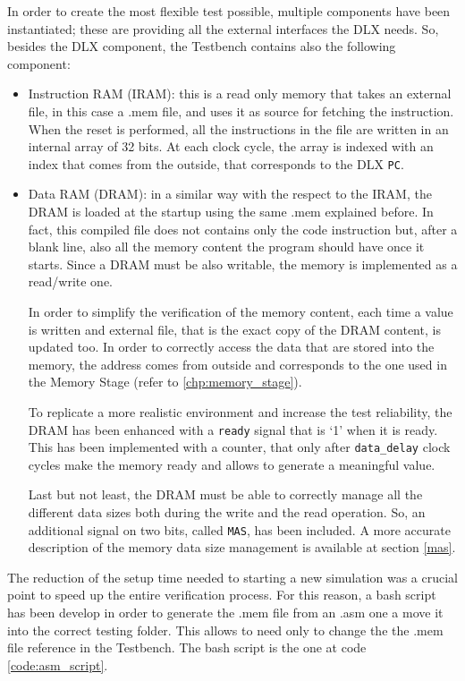 In order to create the most flexible test possible, multiple components have been instantiated; these are providing all the external interfaces the DLX needs. So, besides the DLX component, the Testbench contains also the following component:
\begin{itemize} 
	\item Instruction RAM (IRAM): this is a read only memory that takes an external file, in this case a .mem file, and uses it as source for fetching the instruction. When the reset is performed, all the instructions in the file are written in an internal array of 32 bits. At each clock cycle, the array is indexed with an index that comes from the outside, that corresponds to the DLX \texttt{PC}.
	\item Data RAM (DRAM): in a similar way with the respect to the IRAM, the DRAM is loaded at the startup using the same .mem explained before. In fact, this compiled file does not contains only the code instruction but, after a blank line, also all the memory content the program should have once it starts. Since a DRAM must be also writable, the memory is implemented as a read/write one. 
	
	In order to simplify the verification of the memory content, each time a value is written and external file, that is the exact copy of the DRAM content, is updated too.
	In order to correctly access the data that are stored into the memory, the address comes from outside and corresponds to the one used in the Memory Stage (refer to \ref{chp:memory_stage}).
	
	To replicate a more realistic environment and increase the test reliability, the DRAM has been enhanced with a \texttt{ready} signal that is `1' when it is ready. This has been implemented with a counter, that only after \texttt{data\_delay} clock cycles make the memory ready and allows to generate a meaningful value.
	
	Last but not least, the DRAM must be able to correctly manage all the different data sizes both during the write and the read operation. So, an additional signal on two bits, called \texttt{MAS}, has been included. A more accurate description of the memory data size management is available at section \ref{mas}.
\end{itemize}

The reduction of the setup time needed to starting a new simulation was a crucial point to speed up the entire verification process. For this reason, a bash script has been develop in order to generate the .mem file from an .asm one a move it into the correct testing folder. This allows to need only to change the the .mem file reference in the Testbench. The bash script is the one at code \ref{code:asm_script}.

